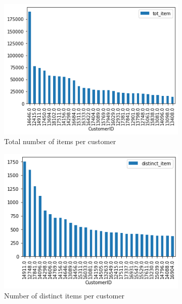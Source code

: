 \begin{figure}[h!]
\captionsetup{justification=centering}
\begin{subfigure}{.3\textwidth}
\centering
\includegraphics[width=\textwidth]{img/preparation/tot_item.png}
\caption{Total number of items per customer}
\label{fig:tot_item}
\end{subfigure}
\begin{subfigure}{.3\textwidth}
\centering
\includegraphics[width=\textwidth]{img/preparation/distinct_item.png}
\caption{Number of distinct items per customer}
\label{ref:distinct_item}
\end{subfigure}
\begin{subfigure}{.3\textwidth}

\end{subfigure}
\end{figure}
